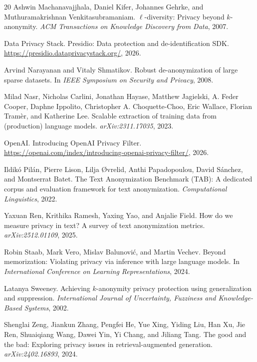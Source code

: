 \documentclass{article}
\begin{document}
\begin{thebibliography}{20}
Ashwin Machanavajjhala, Daniel Kifer, Johannes Gehrke, and Muthuramakrishnan Venkitasubramaniam.
\newblock $\ell$-diversity: Privacy beyond $k$-anonymity.
\newblock \emph{ACM Transactions on Knowledge Discovery from Data}, 2007.

Data Privacy Stack.
\newblock Presidio: Data protection and de-identification SDK.
\newblock \url{https://presidio.dataprivacystack.org/}, 2026.

Arvind Narayanan and Vitaly Shmatikov.
\newblock Robust de-anonymization of large sparse datasets.
\newblock In \emph{IEEE Symposium on Security and Privacy}, 2008.

Milad Nasr, Nicholas Carlini, Jonathan Hayase, Matthew Jagielski, A. Feder Cooper, Daphne Ippolito, Christopher A. Choquette-Choo, Eric Wallace, Florian Tram{\`e}r, and Katherine Lee.
\newblock Scalable extraction of training data from (production) language models.
\newblock \emph{arXiv:2311.17035}, 2023.

OpenAI.
\newblock Introducing OpenAI Privacy Filter.
\newblock \url{https://openai.com/index/introducing-openai-privacy-filter/}, 2026.

Ildik{\'o} Pil{\'a}n, Pierre Lison, Lilja {\O}vrelid, Anthi Papadopoulou, David S{\'a}nchez, and Montserrat Batet.
\newblock The Text Anonymization Benchmark (TAB): A dedicated corpus and evaluation framework for text anonymization.
\newblock \emph{Computational Linguistics}, 2022.

Yaxuan Ren, Krithika Ramesh, Yaxing Yao, and Anjalie Field.
\newblock How do we measure privacy in text? A survey of text anonymization metrics.
\newblock \emph{arXiv:2512.01109}, 2025.

Robin Staab, Mark Vero, Mislav Balunovi{\'c}, and Martin Vechev.
\newblock Beyond memorization: Violating privacy via inference with large language models.
\newblock In \emph{International Conference on Learning Representations}, 2024.

Latanya Sweeney.
\newblock Achieving $k$-anonymity privacy protection using generalization and suppression.
\newblock \emph{International Journal of Uncertainty, Fuzziness and Knowledge-Based Systems}, 2002.

Shenglai Zeng, Jiankun Zhang, Pengfei He, Yue Xing, Yiding Liu, Han Xu, Jie Ren, Shuaiqiang Wang, Dawei Yin, Yi Chang, and Jiliang Tang.
\newblock The good and the bad: Exploring privacy issues in retrieval-augmented generation.
\newblock \emph{arXiv:2402.16893}, 2024.

\end{thebibliography}
\end{document}
